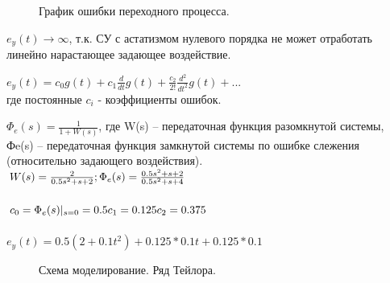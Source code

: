 \documentclass[a4paper, 11pt]{article}
\begin{document}
\begin{figure}[h]
    \caption{График ошибки переходного процесса.}
    \label{tree}
\end{figure}

\newpage
\normalsize{$e_y(t)\to\infty$, т.к. СУ с астатизмом нулевого порядка не может отработать линейно нарастающее задающее воздействие.

$e_y(t)=c_0g(t)+c_1\frac{d}{dt}g(t)+\frac{c_2}{2!}\frac{d^2}{dt^2}g(t)+...$ \\ где постоянные $c_i$ - коэффициенты ошибок.

$\Phi_e(s)=\frac{1}{1+W(s)}$, где W(s) – передаточная функция разомкнутой системы, Фe(s) – передаточная функция замкнутой системы по ошибке слежения \\ (относительно задающего воздействия). \\
$W(s)=\frac {2} {0.5s^2+s+2}; \\\\ \Phi_e(s)=\frac{0.5s^2+s+2}{0.5s^2+s+4}$ \\\\
$c_0=\Phi_e(s) | _{s=0} =0.5 \\  c_1=0.125 \\ c_2=0.375$ \\\\
$e_y(t)=0.5(2+0.1t^2)+0.125*0.1t+0.125*0.1$}

\begin{figure}[h]
    \caption{Схема моделирование. Ряд Тейлора.}
    \label{tree}
\end{figure}
\end{document}
